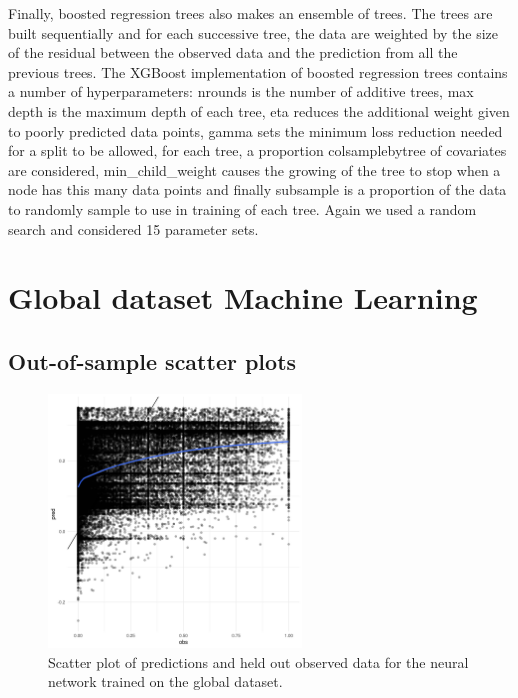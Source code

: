 \documentclass[review]{elsarticle}
\begin{document}
Finally, boosted regression trees also makes an ensemble of trees.
The trees are built sequentially and for each successive tree, the data are weighted by the size of the residual between the observed data and the prediction from all the previous trees.
The XGBoost implementation of boosted regression trees contains a number of hyperparameters: nrounds is the number of additive trees, max depth is the maximum depth of each tree, eta reduces the additional weight given to poorly predicted data points, gamma sets the minimum loss reduction needed for a split to be allowed, for each tree, a proportion colsamplebytree of covariates are considered, min_child_weight causes the growing of the tree to stop when a node has this many data points and finally subsample is a proportion of the data to randomly sample to use in training of each tree.
Again we used a random search and considered 15 parameter sets.

\clearpage
\section{Global dataset Machine Learning}

\clearpage
\subsection{Out-of-sample scatter plots}


\begin{figure}[h!]
  \centering
  \includegraphics[width=0.6\textwidth]{figs/SI/nnet_obspred_global.png}
\caption{
  Scatter plot of predictions and held out observed data for the neural network trained on the global dataset.
}

\end{figure}
\end{document}
